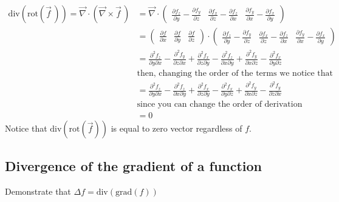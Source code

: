   \begin{align*}
  \text{div}(\text{rot}(\vec f \,)) = \vec\nabla \cdot \left(\vec\nabla \times \vec f\,\right)
    & =
      \vec\nabla \cdot
      \begin{pmatrix}
        \frac{\partial f_z}{\partial y} - \frac{\partial f_y}{\partial z} &
        \frac{\partial f_x}{\partial z} - \frac{\partial f_z}{\partial x} &
        \frac{\partial f_y}{\partial x} - \frac{\partial f_x}{\partial y}
      \end{pmatrix} \\
    & =
      \begin{pmatrix}
        \frac{\partial f}{\partial x} &
        \frac{\partial f}{\partial y} &
        \frac{\partial f}{\partial z}
      \end{pmatrix}
      \cdot
      \begin{pmatrix}
        \frac{\partial f_z}{\partial y} - \frac{\partial f_y}{\partial z} &
        \frac{\partial f_x}{\partial z} - \frac{\partial f_z}{\partial x} &
        \frac{\partial f_y}{\partial x} - \frac{\partial f_x}{\partial y}
      \end{pmatrix} \\
    & =
      \frac{\partial^2 f_z}{\partial y \partial x} - \frac{\partial^2 f_y}{\partial z \partial x} +
      \frac{\partial^2 f_x}{\partial z \partial y} - \frac{\partial^2 f_z}{\partial x \partial y} +
      \frac{\partial^2 f_y}{\partial x \partial z} - \frac{\partial^2 f_x}{\partial y \partial z} \\
    & \text{then, changing the order of the terms we notice that} \\
    & =
      \frac{\partial^2 f_z}{\partial y \partial x} - \frac{\partial^2 f_z}{\partial x \partial y} +
      \frac{\partial^2 f_x}{\partial z \partial y} - \frac{\partial^2 f_x}{\partial y \partial z} +
      \frac{\partial^2 f_y}{\partial x \partial z} - \frac{\partial^2 f_y}{\partial z \partial x} \\
    & \text{since you can change the order of derivation} \\
    & = 0
  \end{align*}
  Notice that $\text{div}(\text{rot}(\vec f))$ is equal to zero vector regardless of $f$.

  \subsection{Divergence of the gradient of a function}
  Demonstrate that $\Delta f = \text{div}(\text{grad}(f))$


